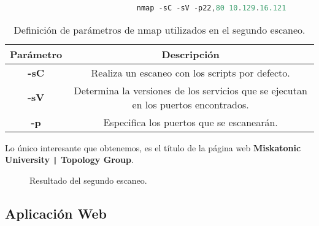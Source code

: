 \documentclass[a4paper]{article} %
\begin{document}
    \captionsetup[lstlisting]{labelfont=bf} %
    \begin{lstlisting}[language=C, caption=Segundo escaneo., aboveskip=0.5cm]
         
                              nmap -sC -sV -p22,80 10.129.16.121
    \end{lstlisting}

    \begin{table}[ht]
        \centering
        \begin{tabular}{|c|c|}
        \hline
        {\color[HTML]{3B00F6} \textbf{Parámetro}} & {\color[HTML]{3B00F6} \textbf{Descripción}}                                         \\ \hline
        \textbf{-sC}                              & Realiza un escaneo con los scripts por defecto.                                                          \\ \hline
        \textbf{-sV}                              & Determina la versiones de los servicios que se ejecutan en los puertos encontrados. \\ \hline
        \textbf{-p}                  & Especifica los puertos que se escanearán.     \\ \hline
        \end{tabular}
    \captionsetup{labelfont=bf} %
    \caption{Definición de parámetros de nmap utilizados en el segundo escaneo.}
    \end{table}

    \vspace{4cm}

    Lo único interesante que obtenemos, es el título de la página web \textbf{Miskatonic University \texttt{|} Topology Group}.

    \begin{figure}[h] %
        \begin{center}
        \setlength{\fboxsep}{0.2em} %
        \end{center}
        \captionsetup{labelfont=bf} %
        \caption{Resultado del segundo escaneo.}
    \end{figure}
    
    \subsection{Aplicación Web}
\end{document}
